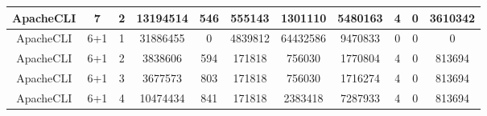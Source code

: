 \begin{table*}[]
\begin{tabular}{@{}ccccccccccc@{}}
        ApacheCLI                                                & 7                                                          & 2    & 13194514                                                    & 546                                                                       & 555143                                                  & 1301110                                                    & 5480163                                                        & 4                                                         & 0                                                         & 3610342 \\ \midrule
        ApacheCLI                                                & 6+1                                                        & 1    & 31886455                                                    & 0                                                                         & 4839812                                                 & 64432586                                                   & 9470833                                                        & 0                                                         & 0                                                         & 0       \\ \midrule
        ApacheCLI                                                & 6+1                                                        & 2    & 3838606                                                     & 594                                                                       & 171818                                                  & 756030                                                     & 1770804                                                        & 4                                                         & 0                                                         & 813694  \\ \midrule
        ApacheCLI                                                & 6+1                                                        & 3    & 3677573                                                     & 803                                                                       & 171818                                                  & 756030                                                     & 1716274                                                        & 4                                                         & 0                                                         & 813694  \\ \midrule
        ApacheCLI                                                & 6+1                                                        & 4    & 10474434                                                    & 841                                                                       & 171818                                                  & 2383418                                                    & 7287933                                                        & 4                                                         & 0                                                         & 813694  \\ \midrule

\end{tabular}
\end{table*}
